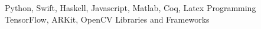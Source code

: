 \begin{cventries}
  \cvsmallentry
    {Python, Swift, Haskell, Javascript, Matlab, Coq, Latex}
    {Programming}
    {}
    {}
    {}
  \cvsmallentry
    {TensorFlow, ARKit, OpenCV}
    {Libraries and Frameworks}
    {}
    {}
    {}
\end{cventries}



